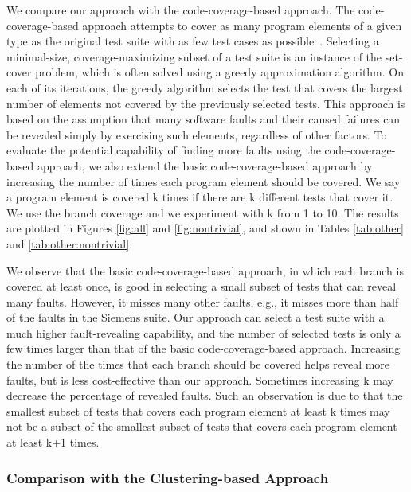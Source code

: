 \documentclass{sig-alternate}
\begin{document}
We compare our approach with the code-coverage-based approach. The
code-coverage-based approach attempts to cover as many program
elements of a given type as the original test suite with as few test
cases as possible~\cite{Leon05}. Selecting a minimal-size,
coverage-maximizing subset of a test suite is an instance of the
set-cover problem, which is often solved using a greedy
approximation algorithm. On each of its iterations, the greedy
algorithm selects the test that covers the largest number of
elements not covered by the previously selected tests. This approach
is based on the assumption that many software faults and their
caused failures can be revealed simply by exercising such elements,
regardless of other factors. To evaluate the potential capability of
finding more faults using the code-coverage-based approach, we also
extend the basic code-coverage-based approach by increasing the
number of times each program element should be covered. We say a
program element is covered k times if there are k different tests
that cover it. We use the branch coverage and we experiment with k
from 1 to 10. The results are plotted in Figures \ref{fig:all} and
\ref{fig:nontrivial}, and shown in Tables \ref{tab:other} and
\ref{tab:other:nontrivial}.

We observe that the basic code-coverage-based approach, in which
each branch is covered at least once, is good in selecting a small
subset of tests that can reveal many faults. However, it misses many
other faults, e.g., it misses more than half of the faults in the
Siemens suite. Our approach can select a test suite with a much
higher fault-revealing capability, and the number of selected tests
is only a few times larger than that of the basic
code-coverage-based approach. Increasing the number of the times
that each branch should be covered helps reveal more faults, but is
less cost-effective than our approach. Sometimes increasing k may
decrease the percentage of revealed faults. Such an observation is
due to that the smallest subset of tests that covers each program
element at least k times may not be a subset of the smallest subset
of tests that covers each program element at least k+1 times.



\subsubsection{Comparison with the Clustering-based Approach}
\end{document}
